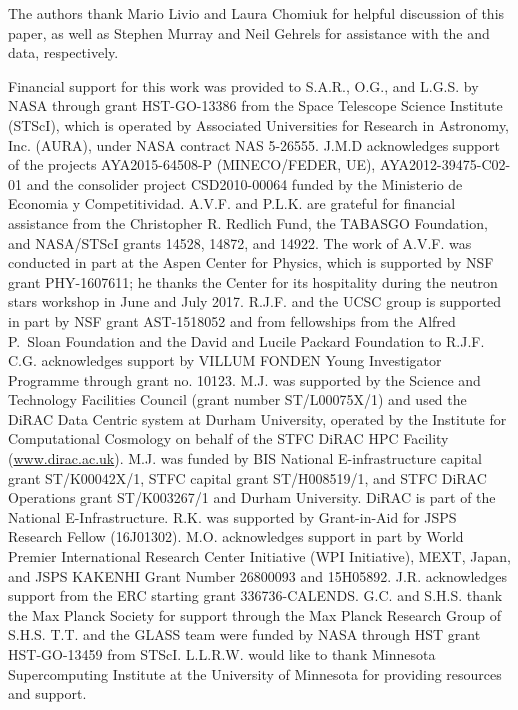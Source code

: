 The authors thank Mario Livio and Laura Chomiuk for helpful discussion
of this paper, as well as Stephen Murray and Neil Gehrels for
assistance with the \Chandra and \Swift data, respectively.

Financial support for this work was provided to S.A.R., O.G., and L.G.S. by NASA
through grant HST-GO-13386 from the Space Telescope Science Institute
(STScI), which is operated by Associated Universities for Research in
Astronomy, Inc. (AURA), under NASA contract NAS 5-26555.
J.M.D acknowledges support of the
projects AYA2015-64508-P (MINECO/FEDER, UE), AYA2012-39475-C02-01 and
the consolider project CSD2010-00064 funded by the Ministerio de
Economia y Competitividad.
A.V.F. and P.L.K. are grateful for financial assistance from the
Christopher R. Redlich Fund, the TABASGO Foundation, and NASA/STScI
grants 14528, 14872, and 14922.  The work of A.V.F. was conducted in
part at the Aspen Center for Physics, which is supported by NSF grant
PHY-1607611; he thanks the Center for its hospitality during the
neutron stars workshop in June and July 2017.
R.J.F. and the UCSC group is supported in part by NSF grant
AST-1518052 and from fellowships from the Alfred P.\ Sloan Foundation
and the David and Lucile Packard Foundation to R.J.F.
C.G. acknowledges support by VILLUM FONDEN Young Investigator Programme through grant no. 10123.
M.J. was supported by the Science and
Technology Facilities Council (grant number ST/L00075X/1) and used the
DiRAC Data Centric system at Durham University, operated by the
Institute for Computational Cosmology on behalf of the STFC DiRAC HPC
Facility (\url{www.dirac.ac.uk}).  M.J. was funded by BIS National
E-infrastructure capital grant ST/K00042X/1, STFC capital grant
ST/H008519/1, and STFC DiRAC Operations grant ST/K003267/1 and Durham
University. DiRAC is part of the National E-Infrastructure.
R.K. was supported by Grant-in-Aid for JSPS Research Fellow (16J01302).
M.O.  acknowledges support in part by World Premier International
Research Center Initiative (WPI Initiative), MEXT, Japan, and JSPS
KAKENHI Grant Number 26800093 and 15H05892.
J.R. acknowledges support from the ERC starting grant
336736-CALENDS.
G.C. and S.H.S. thank the Max Planck Society for support through the Max Planck
Research Group of S.H.S.
T.T. and the GLASS team were funded by NASA through HST grant
HST-GO-13459 from STScI.
L.L.R.W. would like to thank Minnesota Supercomputing Institute at
the University of Minnesota for providing resources and support.

